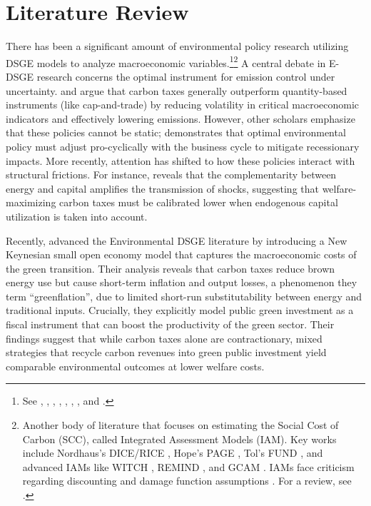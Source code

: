 \documentclass[12pt, a4paper]{article}
\begin{document}
\section{Literature Review}
There has been a significant amount of environmental policy research utilizing DSGE models to analyze macroeconomic variables.\footnote{See \citet{annicchiarico2015}, \citet{dissou2016}, \citet{annicchiarico2017}, \citet{khan2019}, \citet{chan2020a}, \citet{chan2020b}, \citet{lintunen2021}, and \citet{xiao2022}.}\footnote{Another body of literature that focuses on estimating the Social Cost of Carbon (SCC), called Integrated Assessment Models (IAM). Key works include Nordhaus's DICE/RICE \citep{nordhaus1992, nordhaus1994}, Hope's PAGE \citep{hope2006}, Tol's FUND \citep{tol2002}, and advanced IAMs like WITCH \citep{bosetti2006}, REMIND \citep{bauer2013}, and GCAM \citep{calvin2019}. IAMs face criticism regarding discounting and damage function assumptions \citep{weitzman2009, pindyck2017}. For a review, see \citet{fernandez2025}.} A central debate in E-DSGE research concerns the optimal instrument for emission control under uncertainty. \citet{fischer2011} and \citet{bosetti2013} argue that carbon taxes generally outperform quantity-based instruments (like cap-and-trade) by reducing volatility in critical macroeconomic indicators and effectively lowering emissions. However, other scholars emphasize that these policies cannot be static; \citet{heutel2012} demonstrates that optimal environmental policy must adjust pro-cyclically with the business cycle to mitigate recessionary impacts. More recently, attention has shifted to how these policies interact with structural frictions. For instance, \citet{chan2023} reveals that the complementarity between energy and capital amplifies the transmission of shocks, suggesting that welfare-maximizing carbon taxes must be calibrated lower when endogenous capital utilization is taken into account.

Recently, \citet{airaudo2025green} advanced the Environmental DSGE literature by introducing a New Keynesian small open economy model that captures the macroeconomic costs of the green transition. Their analysis reveals that carbon taxes reduce brown energy use but cause short-term inflation and output losses, a phenomenon they term ``greenflation'', due to limited short-run substitutability between energy and traditional inputs. Crucially, they explicitly model public green investment as a fiscal instrument that can boost the productivity of the green sector. Their findings suggest that while carbon taxes alone are contractionary, mixed strategies that recycle carbon revenues into green public investment yield comparable environmental outcomes at lower welfare costs. 
\end{document}
